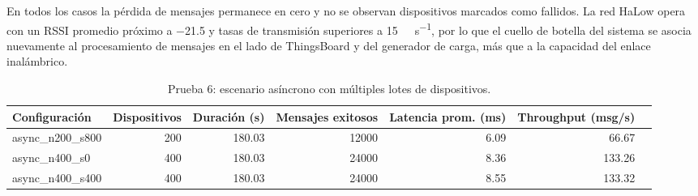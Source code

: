 En todos los casos la p\'erdida de mensajes permanece en cero y no se observan dispositivos marcados como fallidos. La red HaLow opera con un RSSI promedio pr\'oximo a \SI{-21.5}{\decibelm} y tasas de transmisi\'on superiores a \SI{15}{\mega\bit\per\second}, por lo que el cuello de botella del sistema se asocia nuevamente al procesamiento de mensajes en el lado de ThingsBoard y del generador de carga, m\'as que a la capacidad del enlace inal\'ambrico.

\begin{table}[!t]
\centering
\caption{Prueba 6: escenario as\'incrono con m\'ultiples lotes de dispositivos.}
\label{tab:prueba6}
\begin{tabular}{@{}lrrrrrr@{}}
\toprule
Configuraci\'on & Dispositivos & Duraci\'on (s) & Mensajes exitosos & Latencia prom. (ms) & Throughput (msg/s) \\
\midrule
async\_n200\_s800  & 200 & 180.03 & 12000 &  6.09 & 66.67 \\
async\_n400\_s0    & 400 & 180.03 & 24000 &  8.36 & 133.26 \\
async\_n400\_s400  & 400 & 180.03 & 24000 &  8.55 & 133.32 \\
\bottomrule
\end{tabular}
\end{table}
